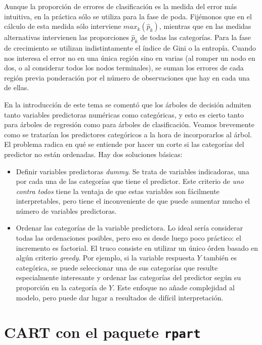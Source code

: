 \documentclass[
]{book}
\theoremstyle{break}
\theoremstyle{nonumberplain}
\begin{document}
Aunque la proporción de errores de clasificación es la medida del error más intuitiva, en la práctica sólo se utiliza para la fase de poda. Fijémonos que en el cálculo de esta medida sólo interviene \(max_{k} (\widehat p_{k})\), mientras que en las medidas alternativas intervienen las proporciones \(\widehat p_{k}\) de todas las categorías. Para la fase de crecimiento se utilizan indistintamente el índice de Gini o la entropía. Cuando nos interesa el error no en una única región sino en varias (al romper un nodo en dos, o al considerar todos los nodos terminales), se suman los errores de cada región previa ponderación por el número de observaciones que hay en cada una de ellas.

En la introducción de este tema se comentó que los árboles de decisión admiten tanto variables predictoras numéricas como categóricas, y esto es cierto tanto para árboles de regresión como para árboles de clasificación. Veamos brevemente como se tratarían los predictores categóricos a la hora de incorporarlos al árbol. El problema radica en qué se entiende por hacer un corte si las categorías del predictor no están ordenadas. Hay dos soluciones básicas:

\begin{itemize}
\item
  Definir variables predictoras \emph{dummy}. Se trata de variables indicadoras, una por cada una de las categorías que tiene el predictor. Este criterio de \emph{uno contra todos} tiene la ventaja de que estas variables son fácilmente interpretables, pero tiene el inconveniente de que puede aumentar mucho el número de variables predictoras.
\item
  Ordenar las categorías de la variable predictora. Lo ideal sería considerar todas las ordenaciones posibles, pero eso es desde luego poco práctico: el incremento es factorial. El truco consiste en utilizar un único órden basado en algún criterio \emph{greedy}. Por ejemplo, si la variable respuesta \(Y\) también es categórica, se puede seleccionar una de sus categorías que resulte especialmente interesante y ordenar las categorías del predictor según su proporción en la categoría de \(Y\). Este enfoque no añade complejidad al modelo, pero puede dar lugar a resultados de difícil interpretación.
\end{itemize}

\hypertarget{cart-con-el-paquete-rpart}{%
\section{\texorpdfstring{CART con el paquete \texttt{rpart}}{CART con el paquete rpart}}\label{cart-con-el-paquete-rpart}}
\end{document}
